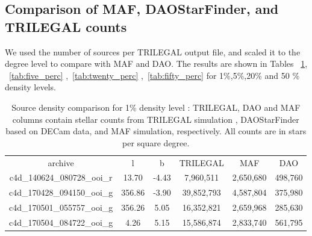 \documentclass[DM,lsstdraft,toc,usenatbib]{lsstdoc}
\begin{document}
\subsection{Comparison of MAF, DAOStarFinder, and TRILEGAL counts}
We used the number of sources per TRILEGAL output file, and scaled it to the degree level to compare with MAF and DAO.  The results are shown in Tables ~\ref{tab:one_perc}, ~\ref{tab:five_perc} ,~\ref{tab:twenty_perc} ,~\ref{tab:fifty_perc} for 1\%,5\%,20\% and 50 \% density levels. 



\begin{table}
\begin{tabular}{cccccc}
archive & l & b & TRILEGAL & MAF & DAO \\
c4d\_140624\_080728\_ooi\_r & 13.70 & -4.43 & 7,960,511 & 2,650,680 & 498,760 \\
c4d\_170428\_094150\_ooi\_g & 356.86 & -3.90 & 39,852,793 & 4,587,804 & 375,980 \\
c4d\_170501\_055757\_ooi\_g & 356.26 & 5.05 & 16,352,821 & 2,659,968 & 285,630 \\
c4d\_170504\_084722\_ooi\_g & 4.26 & 5.15 & 15,586,874 & 2,833,740 & 561,795 \\
\end{tabular}
\caption{Source density comparison for 1\% density level : TRILEGAL, DAO and MAF columns contain stellar counts from TRILEGAL simulation , DAOStarFinder based on DECam data, and MAF simulation, respectively. All counts are in stars per square degree. }
\label{tab:one_perc}
\end{table}
 
\end{document}
